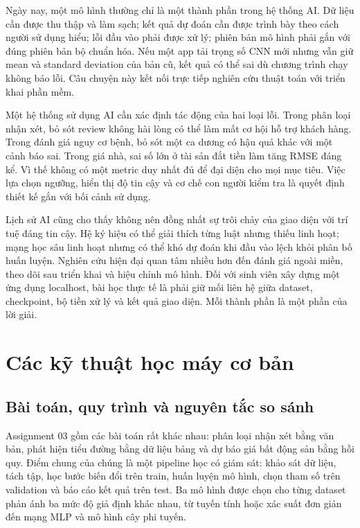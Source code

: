 \documentclass[12pt,a4paper]{report}
\begin{document}
Ngày nay, một mô hình thường chỉ là một thành phần trong hệ thống AI. Dữ liệu cần được thu thập và làm sạch; kết quả dự đoán cần được trình bày theo cách người sử dụng hiểu; lỗi đầu vào phải được xử lý; phiên bản mô hình phải gắn với đúng phiên bản bộ chuẩn hóa. Nếu một app tải trọng số CNN mới nhưng vẫn giữ mean và standard deviation của bản cũ, kết quả có thể sai dù chương trình chạy không báo lỗi. Câu chuyện này kết nối trực tiếp nghiên cứu thuật toán với triển khai phần mềm.

Một hệ thống sử dụng AI cần xác định tác động của hai loại lỗi. Trong phân loại nhận xét, bỏ sót review không hài lòng có thể làm mất cơ hội hỗ trợ khách hàng. Trong đánh giá nguy cơ bệnh, bỏ sót một ca dương có hậu quả khác với một cảnh báo sai. Trong giá nhà, sai số lớn ở tài sản đắt tiền làm tăng RMSE đáng kể. Vì thế không có một metric duy nhất đủ để đại diện cho mọi mục tiêu. Việc lựa chọn ngưỡng, hiển thị độ tin cậy và cơ chế con người kiểm tra là quyết định thiết kế gắn với bối cảnh sử dụng.

Lịch sử AI cũng cho thấy không nên đồng nhất sự trôi chảy của giao diện với trí tuệ đáng tin cậy. Hệ ký hiệu có thể giải thích từng luật nhưng thiếu linh hoạt; mạng học sâu linh hoạt nhưng có thể khó dự đoán khi đầu vào lệch khỏi phân bố huấn luyện. Nghiên cứu hiện đại quan tâm nhiều hơn đến đánh giá ngoài miền, theo dõi sau triển khai và hiệu chỉnh mô hình. Đối với sinh viên xây dựng một ứng dụng localhost, bài học thực tế là phải giữ mối liên hệ giữa dataset, checkpoint, bộ tiền xử lý và kết quả giao diện. Mỗi thành phần là một phần của lời giải.

\chapter{Các kỹ thuật học máy cơ bản}\label{ch:ml}
\section{Bài toán, quy trình và nguyên tắc so sánh}
Assignment 03 gồm các bài toán rất khác nhau: phân loại nhận xét bằng văn bản, phát hiện tiểu đường bằng dữ liệu bảng và dự báo giá bất động sản bằng hồi quy. Điểm chung của chúng là một pipeline học có giám sát: khảo sát dữ liệu, tách tập, học bước biến đổi trên train, huấn luyện mô hình, chọn tham số trên validation và báo cáo kết quả trên test. Ba mô hình được chọn cho từng dataset phản ánh ba mức độ giả định khác nhau, từ tuyến tính hoặc xác suất đơn giản đến mạng MLP và mô hình cây phi tuyến.
\end{document}
